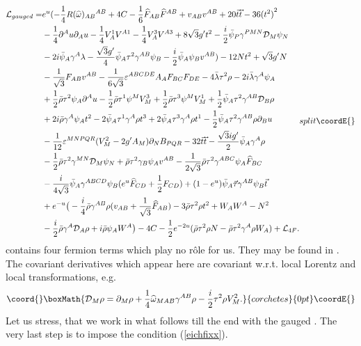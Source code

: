 \documentclass[a4paper,12pt, twoside]{article}
\numberwithin{equation}{section}
\begin{document}
\begin{equation}
{\begin{split}
{\cal L}_{gauged} = & 
e^u(-\frac{1}{4}R(\widehat{\omega})_{AB}{}^{AB}+4C-\frac{1}{6}\widehat{F}_{AB}\widehat{F}^{AB}+v_{AB}v^{AB}+20 
\vec{t}\vec{t}-36{(t^2)}^2\\
& -\frac{1}{4}\partial^Au\partial_Au - \frac{1}{4}V_A^1V^{A1} - 
\frac{1}{4}V_A^3V^{A3}+8\sqrt{3}g't^2-\frac{i}{2}\bar{\psi}_P\gamma^{PMN}{\cal 
D}_M\psi_N\\
&-2i\bar{\psi}_A\gamma^A\lambda-\frac{\sqrt{3}g'}{4}\bar{\psi}_A\tau^2\gamma^{AB}\psi_B 
- \frac{i}{2}\bar{\psi}_A\psi_Bv^{AB}) -12Nt^2+\sqrt{3}g'N\\
& -\frac{1}{\sqrt{3}}F_{AB}v^{AB} 
-\frac{1}{6\sqrt{3}}\varepsilon^{ABCDE} A_AF_{BC}F_{DE}- 
4\bar{\lambda}\tau^2\rho-2i\bar{\lambda}\gamma^A\psi_A\\
& + 
\frac{1}{2}\bar{\rho}\tau^2\psi_A\partial^Au-\frac{1}{2}\bar{\rho}\tau^1\psi^MV_M^3+\frac{1}{2}\bar{\rho}\tau^3\psi^MV_M^1+\frac{1}{2}\bar{\psi}_A\tau^2\gamma^{AB}{\cal 
D}_B\rho\\
& + 2i\bar{\rho}\gamma^A\psi_A t^2 - 2\bar{\psi}_A\tau^1\gamma^A\rho 
t^3 + 2\bar{\psi}_A\tau^3\gamma^A\rho 
t^1-\frac{1}{2}\bar{\psi}_A\tau^2\gamma^{AB}\rho \partial_B u\\
& - \frac{1}{12}\varepsilon^{MNPQR}(V_M^2-2g'A_M)\partial_NB_{PQR}-32 
\vec{t}\vec{t}-\frac{\sqrt{3}ig'}{2}\bar{\psi}_A\gamma^A\rho \\
& - \frac{1}{2}\bar{\rho}\tau^2\gamma^{MN}{\cal D}_M\psi_N + 
\bar{\rho}\tau^2\gamma_B\psi_Av^{AB} - 
\frac{1}{2\sqrt{3}}\bar{\rho}\tau^2\gamma^{ABC}\psi_A\widehat{F}_{BC}\\
& - 
\frac{i}{4\sqrt{3}}\bar{\psi}_A\gamma^{ABCD}\psi_B(e^u\widehat{F}_{CD} + \frac{1}{2}F_{CD}) + 
(1-e^u)\bar{\psi}_A\vec{\tau}\gamma^{AB}\psi_B\vec{t}\\
& +e^{-u}\big( - 
\frac{i}{4}\bar{\rho}\gamma^{AB}\rho(v_{AB}+\frac{1}{\sqrt{3}}\widehat{F}_{AB}) - 3\bar{\rho}\tau^2\rho t^2+W_AW^A-N^2\\
& -\frac{i}{2}\bar{\rho}\gamma^A{\cal D}_A\rho+i\bar{\rho}\psi_A 
W^A\big)-4C -\frac{1}{2}e^{-2u}(\bar{\rho}\tau^2\rho N 
-\bar{\rho}\tau^2\gamma^A\rho W_A) +{\cal L}_{4F}.
\end{split}
}{split}\coordE{}\end{equation}
\coordHE{} contains four fermion terms which play no r\^ole for 
us. They may be found in \cite{diss}. The covariant derivatives which 
appear here are covariant w.r.t. local Lorentz and local \coordHE{} 
transformations, e.g.
\[\coord{}\boxMath{
{\cal 
D}_M\rho=\partial_M\rho+\frac{1}{4}\widehat{\omega}_{MAB}\gamma^{AB}\rho-\frac{i}{2}\tau^2\rho V_M^2.
}{corchetes}{0pt}\coordE{}\]
Let us stress, that we work in what follows till the end with the 
gauged \coordHE{}. The very last step is to impose the condition 
(\ref{eichfixx}).
\end{document}
